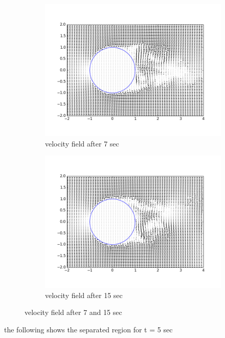 \documentclass[a4paper,11pt]{article}
\begin{document}
\begin{figure}[ht]
  \centering
  \begin{subfigure}[ht]{.5\textwidth}
      \centering
      \includegraphics[width=.8\linewidth]{qui_7.png}
      \caption{velocity field after 7 sec}
      \label{fig:641}
  \end{subfigure}
  \begin{subfigure}[ht]{.5\textwidth}
      \centering
      \includegraphics[width=.8\linewidth]{qui_15.png}
      \caption{velocity field after 15 sec}
      \label{fig:801}
  \end{subfigure}
  \label{fig:Question 1a1}
  \caption{velocity field after 7 and 15 sec}
\end{figure}
\indent the following shows the separated region for t = 5 sec\\
\end{document}
